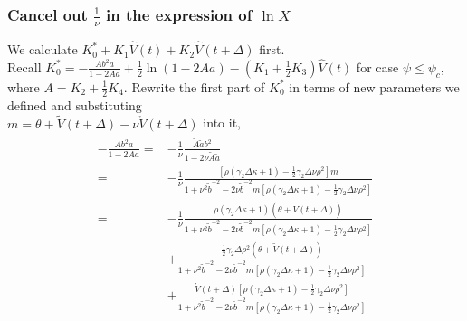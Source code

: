 \documentclass{ws-ijfe}
\begin{document}
\subsubsection{Cancel out $\frac{1}{\nu}$ in the expression of $\ln X$}
We calculate $K_0^*+K_1\hat{V}(t)+K_2\hat{V}(t+\Delta)$ first. \\
Recall $K_0^*= -\frac{Ab^2a}{1-2Aa}+\frac{1}{2}\ln(1-2Aa)-(K_1+\frac{1}{2}K_3)\hat{V}(t)$ for case $\psi\leq\psi_c$, where $A=K_2+\frac{1}{2}K_4$.
Rewrite the first part of $K_0^*$ in terms of new parameters we defined and substituting \\$m=\theta+\tilde{V}(t+\Delta)-\nu\mathring{V}(t+\Delta)$ into it,
\begin{equation*}
\begin{split}
  -\frac{Ab^2a}{1-2Aa}=&-\frac{1}{\nu}\frac{\tilde{A}\tilde{a}\tilde{b^2}}{1-2\nu\tilde{A}\tilde{a}}\\
  =&-\frac{1}{\nu}\frac{[\rho(\gamma_2\Delta\kappa+1)-\frac{1}{2}\gamma_2\Delta\nu\rho^2]m}{1+\nu^2\tilde{b}^{-2}-2\nu\tilde{b}^{-2}m[\rho(\gamma_2\Delta\kappa+1)-\frac{1}{2}\gamma_2\Delta\nu\rho^2]}\\
  =&-\frac{1}{\nu}\frac{\rho(\gamma_2\Delta\kappa+1)(\theta+\tilde{V}(t+\Delta))}{1+\nu^2\tilde{b}^{-2}-2\nu\tilde{b}^{-2}m[\rho(\gamma_2\Delta\kappa+1)-\frac{1}{2}\gamma_2\Delta\nu\rho^2]}\\
  &+\frac{\frac{1}{2}\gamma_2\Delta\rho^2(\theta+\tilde{V}(t+\Delta))}{1+\nu^2\tilde{b}^{-2}-2\nu\tilde{b}^{-2}m[\rho(\gamma_2\Delta\kappa+1)-\frac{1}{2}\gamma_2\Delta\nu\rho^2]}\\
  &+\frac{\mathring{V}(t+\Delta)[\rho(\gamma_2\Delta\kappa+1)-\frac{1}{2}\gamma_2\Delta\nu\rho^2]}{1+\nu^2\tilde{b}^{-2}-2\nu\tilde{b}^{-2}m[\rho(\gamma_2\Delta\kappa+1)-\frac{1}{2}\gamma_2\Delta\nu\rho^2]}
\end{split}
\end{equation*}
\end{document}
